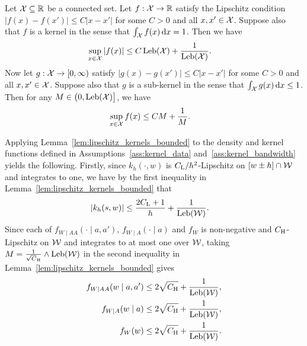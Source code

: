 \begin{lemma}
  \label{lem:lipschitz_kernels_bounded}

  Let $\mathcal{X} \subseteq \mathbb{R}$ be a connected set.
  Let $f: \mathcal{X} \to \mathbb{R}$ satisfy the Lipschitz condition
  $|f(x) - f(x')| \leq C |x-x'|$ for some $C > 0$
  and all $x, x' \in \mathcal{X}$.
  Suppose also that $f$ is a kernel in the sense that
  $\int_{\mathcal{X}} f(x) \,\mathrm{d}x = 1$.
  Then we have
  \begin{align*}
    \sup_{x \in \mathcal{X}} |f(x)|
    &\leq
    C \operatorname{Leb}(\mathcal{X}) + \frac{1}{\operatorname{Leb}(\mathcal{X})}.
  \end{align*}
  Now let $g: \mathcal{X} \to [0,\infty)$ satisfy
    $|g(x) - g(x')| \leq C |x-x'|$ for some $C > 0$
    and all $x, x' \in \mathcal{X}$.
    Suppose also that $g$ is a sub-kernel in the sense that
    $\int_{\mathcal{X}} g(x) \,\mathrm{d}x \leq 1$.
    Then for any $M \in \big(0, \operatorname{Leb}(\mathcal{X})\big]$,
  we have
  \begin{align*}
    \sup_{x \in \mathcal{X}} f(x)
    &\leq
    C M + \frac{1}{M}.
  \end{align*}

\end{lemma}

\begin{remark}

  Applying Lemma~\ref{lem:lipschitz_kernels_bounded}
  to the density and kernel functions defined in
  Assumptions~\ref{ass:kernel_data} and~\ref{ass:kernel_bandwidth}
  yields the following.
  Firstly, since $k_h(\cdot, w)$ is $C_\mathrm{L}/h^2$-Lipschitz
  on $[w \pm h] \cap \mathcal{W}$ and integrates to one,
  we have by the first inequality in
  Lemma~\ref{lem:lipschitz_kernels_bounded} that
  \begin{align*}
    |k_h(s,w)|
    &\leq \frac{2 C_\mathrm{L} + 1}{h} + \frac{1}{\operatorname{Leb}(\mathcal{W})}.
  \end{align*}
  Since each of
  $f_{W \mid AA}(\cdot \mid a,a')$,
  $f_{W \mid A}(\cdot \mid a)$ and
  $f_W$ is non-negative and $C_\mathrm{H}$-Lipschitz on $\mathcal{W}$
  and integrates to at most one over $\mathcal{W}$,
  taking $M = \frac{1}{\sqrt \CH} \wedge \Leb(\cW)$
  in the second inequality in
  Lemma~\ref{lem:lipschitz_kernels_bounded}
  gives
  \begin{align*}
    f_{W \mid AA}(w \mid a,a')
    &\leq 2 \sqrt{C_\mathrm{H}} + \frac{1}{\operatorname{Leb}(\mathcal{W})}, \\
    f_{W \mid A}(w \mid a)
    &\leq 2 \sqrt{C_\mathrm{H}} + \frac{1}{\operatorname{Leb}(\mathcal{W})}, \\
    f_W(w)
    &\leq 2 \sqrt{C_\mathrm{H}} + \frac{1}{\operatorname{Leb}(\mathcal{W})}.
  \end{align*}

\end{remark}

